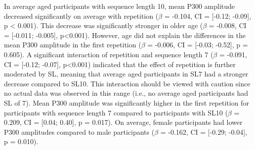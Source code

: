 In average aged participants with sequence length 10, mean P300 amplitude decreased significantly on average with repetition ($\beta$ = -0.104, CI = [-0.12; -0.09], p < 0.001). This decrease was significantly stronger in older age ($\beta$ = -0.008, CI = [-0.011; -0.005], p<0.001). However, age did not explain the differences in the mean P300 amplitude in the first repetition ($\beta$ = -0.006, CI = [-0.03; -0.52], p = 0.605). A significant interaction of repetition and sequence length 7 ($\beta$ = -0.091, CI = [-0.12; -0.07], p<0.001) indicated that the effect of repetition is further moderated by SL, meaning that average aged participants in SL7 had a stronger decrease compared to SL10. This interaction should be viewed with caution since no actual data was observed in this range (i.e., no average aged participants had SL of 7). Mean P300 amplitude was significantly higher in the first repetition for participants with sequence length 7 compared to participants with SL10 ($\beta$ = 0.209, CI = [0.04; 0.40], p = 0.017). On average, female participants had lower P300 amplitudes compared to male participants ($\beta$ = -0.162, CI = [-0.29; -0.04], p = 0.010). 
